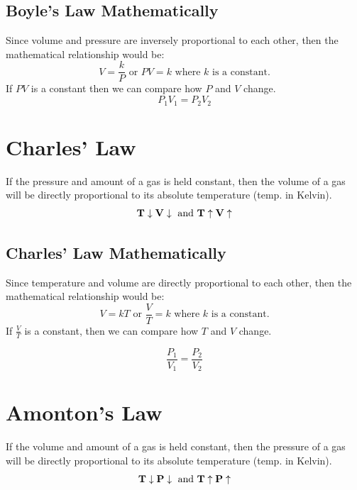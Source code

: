 \documentclass[
	chapter=5,
	title={Gases},
	showanswers=true,
]{chem122notes}
\begin{document}
\subsection{Boyle's Law Mathematically}\label{subsec:boyle's-law-mathematically}
Since volume and pressure are inversely proportional to each other, then the mathematical relationship would be:
\[ V = \frac{k}{P} \mbox{  or  } PV = k \mbox{   where } k \mbox{ is a constant.} \]
If $PV$ is a constant then we can compare how $P$ and $V$ change.
\begin{equation}
	P_{1}V_{1} = P_{2}V_{2}
	\label{eq:boyles-law-mathematically}
\end{equation}

\section{Charles' Law}\label{sec:charles-law}
If the pressure and amount of a gas is held constant, then the volume of a gas will be directly proportional to its absolute temperature (temp. in Kelvin).
\begin{equation}
	\mbox{\textbf{T}} \downarrow \mbox{\textbf{V}} \downarrow \mbox{  and  } \mbox{\textbf{T}} \uparrow \mbox{\textbf{V}} \uparrow
	\label{eq:charles-law}
\end{equation}

\subsection{Charles' Law Mathematically}\label{subsec:charles-law-mathematically}
Since temperature and volume are directly proportional to each other, then the mathematical relationship would be:
\[ V = kT \mbox{  or  } \frac{V}{T} = k \mbox{   where } k \mbox{ is a constant.} \]
If $\frac{V}{T}$ is a constant, then we can compare how $T$ and $V$ change.

\begin{equation}
	\frac{P_{1}}{V_{1}} = \frac{P_{2}}{V_{2}}
	\label{eq:charles-law-mathematically}
\end{equation}

\section{Amonton's Law}\label{sec:amontons-law}
If the volume and amount of a gas is held constant, then the pressure of a gas will be directly proportional to its absolute temperature (temp. in Kelvin).
\begin{equation}
	\mbox{\textbf{T}} \downarrow \mbox{\textbf{P}} \downarrow \mbox{  and  } \mbox{\textbf{T}} \uparrow \mbox{\textbf{P}} \uparrow
	\label{eq:amontons-law}
\end{equation}
\end{document}
